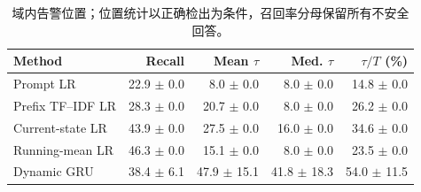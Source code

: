\begin{table}[t]
\centering\footnotesize
\caption{域内告警位置；位置统计以正确检出为条件，召回率分母保留所有不安全回答。}\label{tab:alert_positions}
\begin{tabular}{lrrrr}\toprule
Method & Recall & Mean $\tau$ & Med. $\tau$ & $\tau/T$ (\%) \\
\midrule
Prompt LR & 22.9 $\pm$ 0.0 & 8.0 $\pm$ 0.0 & 8.0 $\pm$ 0.0 & 14.8 $\pm$ 0.0 \\
Prefix TF--IDF LR & 28.3 $\pm$ 0.0 & 20.7 $\pm$ 0.0 & 8.0 $\pm$ 0.0 & 26.2 $\pm$ 0.0 \\
Current-state LR & 43.9 $\pm$ 0.0 & 27.5 $\pm$ 0.0 & 16.0 $\pm$ 0.0 & 34.6 $\pm$ 0.0 \\
Running-mean LR & 46.3 $\pm$ 0.0 & 15.1 $\pm$ 0.0 & 8.0 $\pm$ 0.0 & 23.5 $\pm$ 0.0 \\
Dynamic GRU & 38.4 $\pm$ 6.1 & 47.9 $\pm$ 15.1 & 41.8 $\pm$ 18.3 & 54.0 $\pm$ 11.5 \\
\bottomrule\end{tabular}
\end{table}
